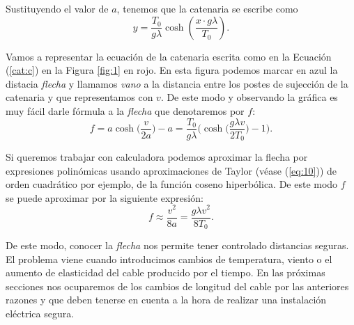 Sustituyendo el valor de $a$, tenemos que la catenaria se escribe como
\begin{equation}\label{cat:c}
  y = \frac{T_0}{g \lambda}\cosh \left(\frac{x\cdot g \lambda}{T_0} \right).
\end{equation}

Vamos a representar la ecuación de la catenaria escrita como en la
Ecuación (\ref{cat:c}) en la Figura \ref{fig:1} en rojo. En esta figura
podemos marcar en azul la distacia \emph{flecha} y llamamos \emph{vano} a la
distancia entre los postes de sujección de la catenaria y que representamos con $v$. De este modo
y observando la gráfica es muy fácil darle fórmula a la \emph{flecha}
que denotaremos por $f$:
\begin{equation}
  \label{eq:4}
  f =  a\cosh\Big(\frac{v}{2a}\Big)-a=
  \frac{T_0}{g\lambda}\Big(\cosh\Big(\frac{g\lambda v}{2T_0}\Big)-1\Big).
\end{equation}

Si queremos trabajar con calculadora podemos aproximar la flecha por
expresiones polinómicas usando aproximaciones de Taylor (véase
(\ref{eq:10})) de orden cuadrático por ejemplo, de la función coseno
hiperbólica. De este modo $f$ se puede aproximar por la siguiente
expresión:
 \begin{equation}
  \label{eq:12}
  f \approx{} \frac{v^2}{8a} = \frac{g\lambda v^2}{8T_0}.
\end{equation}

De este modo, conocer la \emph{flecha} nos permite tener controlado
distancias seguras. El problema viene cuando introducimos cambios de
temperatura, viento o el aumento de elasticidad del cable producido por el
tiempo. En las próximas secciones nos ocuparemos de los cambios de
longitud del cable por las anteriores razones y que deben tenerse
en cuenta a la hora de realizar una instalación eléctrica segura.

